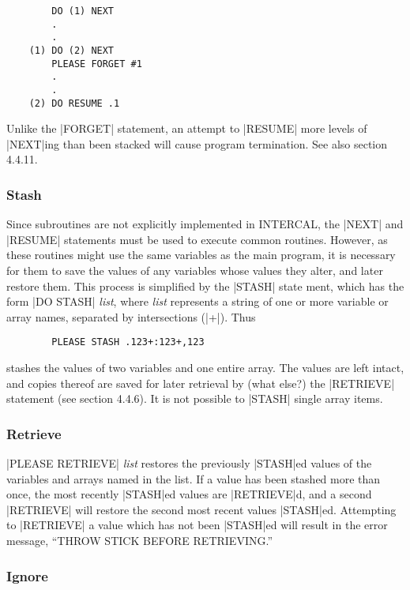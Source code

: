 \begin{verbatim}
        DO (1) NEXT
        .
        .
    (1) DO (2) NEXT
        PLEASE FORGET #1
        .
        .
    (2) DO RESUME .1
\end{verbatim}

Unlike the |FORGET| statement, an attempt to |RESUME| more levels of
|NEXT|ing than been stacked will cause program termination.  See also
section 4.4.11.


\subsubsection{Stash}

Since subroutines are not explicitly implemented in INTERCAL, the |NEXT|
and |RESUME| statements must be used to execute common routines.  However,
as these routines might use the same variables as the main program, it is
necessary for them to save the values of any variables whose values they
alter, and later restore them.  This process is simplified by the |STASH|
state ment, which has the form |DO STASH| {\em list}, where {\em list}
represents a string of one or more variable or array names, separated by
intersections (|+|).  Thus

\begin{verbatim}
        PLEASE STASH .123+:123+,123
\end{verbatim}
stashes the values of two variables and one entire array.  The values are
left intact, and copies thereof are saved for later retrieval by (what
else?)  the |RETRIEVE| statement (see section 4.4.6).  It is not possible
to |STASH| single array items.

\subsubsection{Retrieve}

|PLEASE RETRIEVE| {\em list} restores the previously |STASH|ed values of
the variables and arrays named in the list.  If a value has been
stashed more than once, the most recently |STASH|ed values are |RETRIEVE|d,
and a second |RETRIEVE| will restore the second most recent values
|STASH|ed.  Attempting to |RETRIEVE| a value which has not been |STASH|ed
will result in the error message, ``THROW STICK BEFORE RETRIEVING.''

\subsubsection{Ignore}

